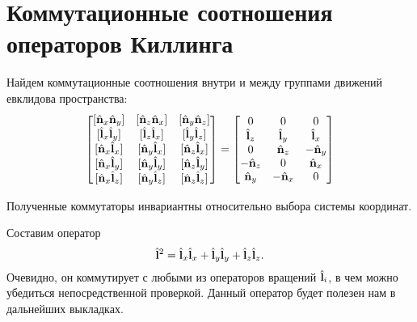 \documentclass[12pt,a4paper]{article}
\begin{document}

    \section{Коммутационные соотношения операторов Киллинга}

        Найдем коммутационные соотношения внутри и между группами движений евклидова пространства:
        \begin{equation}
            \begin{bmatrix}
                [ \Op{n}_x \Op{n}_y ] & [ \Op{n}_z \Op{n}_x ] & [ \Op{n}_y \Op{n}_z ] \\
                [ \Op{l}_x \Op{l}_y ] & [ \Op{l}_z \Op{l}_x ] & [ \Op{l}_y \Op{l}_z ] \\
                [ \Op{n}_x \Op{l}_x ] & [ \Op{n}_y \Op{l}_x ] & [ \Op{n}_z \Op{l}_x ] \\
                [ \Op{n}_x \Op{l}_y ] & [ \Op{n}_y \Op{l}_y ] & [ \Op{n}_z \Op{l}_y ] \\
                [ \Op{n}_x \Op{l}_z ] & [ \Op{n}_y \Op{l}_z ] & [ \Op{n}_z \Op{l}_z ]
            \end{bmatrix}
            =
            \begin{bmatrix}
                0          &   0        &   0        \\
                  \Op{l}_z &   \Op{l}_y &   \Op{l}_x \\
                0          &   \Op{n}_z & - \Op{n}_y \\
                - \Op{n}_z &   0        &   \Op{n}_x \\
                  \Op{n}_y & - \Op{n}_x &   0
            \end{bmatrix}
        \end{equation}

        Полученные коммутаторы инвариантны относительно выбора системы координат.

        Составим оператор
        \begin{equation}
            \hat{\mathbf{l}}^2 = \hat{\mathbf{l}}_x \hat{\mathbf{l}}_x + \hat{\mathbf{l}}_y \hat{\mathbf{l}}_y + \hat{\mathbf{l}}_z \hat{\mathbf{l}}_z .
        \end{equation}
        Очевидно, он коммутирует с любыми из операторов вращений $\hat{\mathbf{l}}_i$, в чем можно убедиться непосредственной проверкой. Данный оператор будет полезен нам в дальнейших выкладках.
\end{document}
